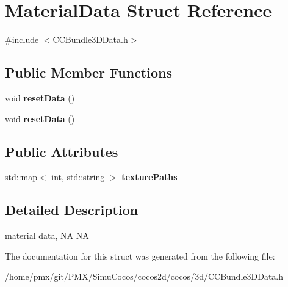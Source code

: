 \hypertarget{structMaterialData}{}\section{Material\+Data Struct Reference}
\label{structMaterialData}


{\ttfamily \#include $<$C\+C\+Bundle3\+D\+Data.\+h$>$}

\subsection*{Public Member Functions}
\begin{DoxyCompactItemize}
\item 
\mbox{\label{structMaterialData_a8d7c9a5970d1f8fcca57d1c2349fd497}} 
void {\bfseries reset\+Data} ()
\item 
\mbox{\label{structMaterialData_a8d7c9a5970d1f8fcca57d1c2349fd497}} 
void {\bfseries reset\+Data} ()
\end{DoxyCompactItemize}
\subsection*{Public Attributes}
\begin{DoxyCompactItemize}
\item 
\mbox{\label{structMaterialData_a351de811af616d63fa23261754234886}} 
std\+::map$<$ int, std\+::string $>$ {\bfseries texture\+Paths}
\end{DoxyCompactItemize}


\subsection{Detailed Description}
material data,  NA  NA 

The documentation for this struct was generated from the following file\+:\begin{DoxyCompactItemize}
\item 
/home/pmx/git/\+P\+M\+X/\+Simu\+Cocos/cocos2d/cocos/3d/C\+C\+Bundle3\+D\+Data.\+h\end{DoxyCompactItemize}
